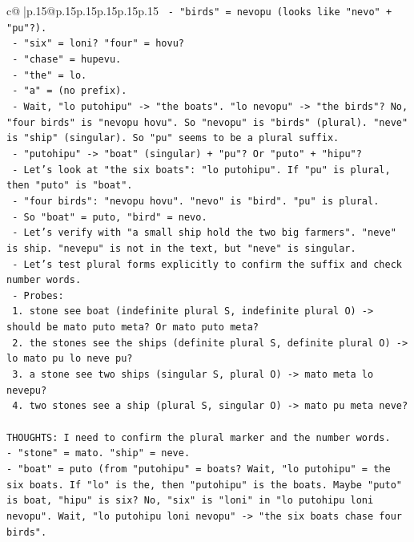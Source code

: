 \documentclass{article}
\begin{document}
{\begin{supertabular}{c@{$\;$}|p{.15\linewidth}@{}p{.15\linewidth}p{.15\linewidth}p{.15\linewidth}p{.15\linewidth}p{.15\linewidth}}
{{{\texttt{     {-} "birds" = nevopu (looks like "nevo" + "pu"?).} \\
\texttt{     {-} "six" = loni? "four" = hovu?} \\
\texttt{     {-} "chase" = hupevu.} \\
\texttt{     {-} "the" = lo.} \\
\texttt{     {-} "a" = (no prefix).} \\
\texttt{     {-} Wait, "lo putohipu" {-}> "the boats". "lo nevopu" {-}> "the birds"? No, "four birds" is "nevopu hovu". So "nevopu" is "birds" (plural). "neve" is "ship" (singular). So "pu" seems to be a plural suffix.} \\
\texttt{     {-} "putohipu" {-}> "boat" (singular) + "pu"? Or "puto" + "hipu"?} \\
\texttt{     {-} Let's look at "the six boats": "lo putohipu". If "pu" is plural, then "puto" is "boat".} \\
\texttt{     {-} "four birds": "nevopu hovu". "nevo" is "bird". "pu" is plural.} \\
\texttt{     {-} So "boat" = puto, "bird" = nevo.} \\
\texttt{     {-} Let's verify with "a small ship hold the two big farmers". "neve" is ship. "nevepu" is not in the text, but "neve" is singular.} \\
\texttt{     {-} Let's test plural forms explicitly to confirm the suffix and check number words.} \\
\texttt{     {-} Probes:} \\
\texttt{       1. stone see boat (indefinite plural S, indefinite plural O) {-}> should be mato puto meta? Or mato puto meta?} \\
\texttt{       2. the stones see the ships (definite plural S, definite plural O) {-}> lo mato pu lo neve pu?} \\
\texttt{       3. a stone see two ships (singular S, plural O) {-}> mato meta lo nevepu?} \\
\texttt{       4. two stones see a ship (plural S, singular O) {-}> mato pu meta neve?} \\
\\ 
\texttt{THOUGHTS: I need to confirm the plural marker and the number words.} \\
\texttt{{-} "stone" = mato. "ship" = neve.} \\
\texttt{{-} "boat" = puto (from "putohipu" = boats? Wait, "lo putohipu" = the six boats. If "lo" is the, then "putohipu" is the boats. Maybe "puto" is boat, "hipu" is six? No, "six" is "loni" in "lo putohipu loni nevopu". Wait, "lo putohipu loni nevopu" {-}> "the six boats chase four birds".} \\
}}}
\end{supertabular}}
\end{document}

